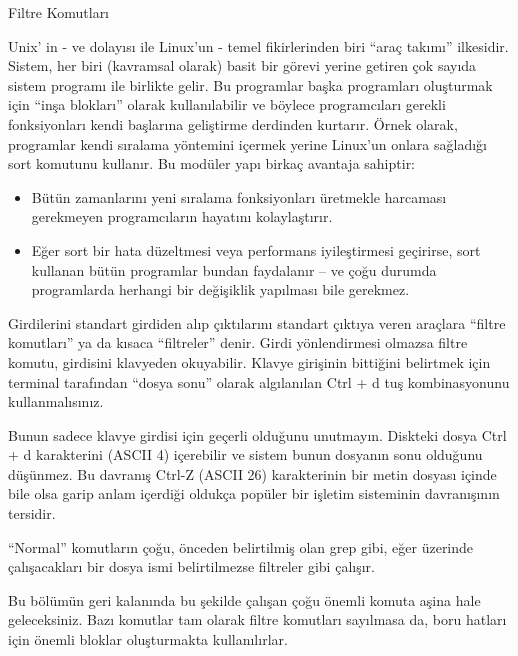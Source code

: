 \begin{section}{Filtre Komutları}

Unix' in - ve dolayısı ile Linux'un - temel fikirlerinden biri ``araç takımı'' ilkesidir. Sistem, her biri (kavramsal olarak) basit bir görevi yerine getiren çok sayıda sistem programı ile birlikte gelir. Bu programlar başka programları oluşturmak için “inşa blokları” olarak kullanılabilir ve böylece programcıları gerekli fonksiyonları kendi başlarına geliştirme derdinden kurtarır. Örnek olarak, programlar kendi sıralama yöntemini içermek yerine Linux'un onlara sağladığı sort komutunu kullanır. Bu modüler yapı birkaç avantaja sahiptir:

\begin{itemize}
\item Bütün zamanlarını yeni sıralama fonksiyonları üretmekle harcaması gerekmeyen programcıların hayatını kolaylaştırır.
\item Eğer sort bir hata düzeltmesi veya performans iyileştirmesi geçirirse, sort kullanan bütün programlar bundan faydalanır – ve çoğu durumda programlarda herhangi bir değişiklik yapılması bile gerekmez.
\end{itemize}

Girdilerini standart girdiden alıp çıktılarını standart çıktıya veren araçlara “filtre komutları” ya da kısaca “filtreler” denir. Girdi yönlendirmesi olmazsa filtre komutu, girdisini klavyeden okuyabilir. Klavye girişinin bittiğini belirtmek için terminal tarafından “dosya sonu” olarak algılanılan Ctrl + d tuş kombinasyonunu kullanmalısınız.

Bunun sadece klavye girdisi için geçerli olduğunu unutmayın. Diskteki dosya Ctrl + d karakterini (ASCII 4) içerebilir ve sistem bunun dosyanın sonu olduğunu düşünmez. Bu davranış Ctrl-Z (ASCII 26) karakterinin bir metin dosyası içinde bile olsa garip anlam içerdiği oldukça popüler bir işletim sisteminin davranışının tersidir.

“Normal” komutların çoğu, önceden belirtilmiş olan grep gibi, eğer üzerinde çalışacakları bir dosya ismi belirtilmezse filtreler gibi çalışır.

Bu bölümün geri kalanında bu şekilde çalışan çoğu önemli komuta aşina hale geleceksiniz. Bazı komutlar tam olarak filtre komutları sayılmasa da, boru hatları için önemli bloklar oluşturmakta kullanılırlar.


\end{section}

